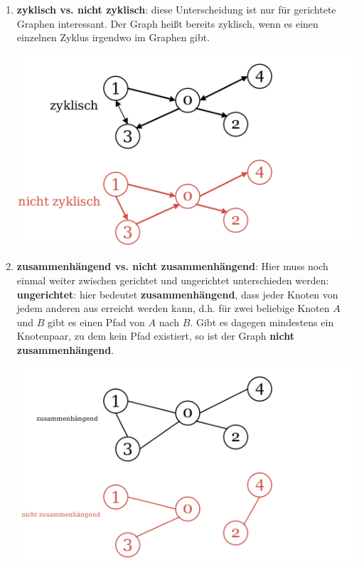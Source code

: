 \documentclass{article}
\begin{document}
\begin{enumerate}
\begin{center}
    \end{center}
    \item \textbf{zyklisch vs. nicht zyklisch}: diese Unterscheidung ist nur für gerichtete Graphen interessant. Der Graph heißt bereits zyklisch, wenn es einen einzelnen Zyklus irgendwo im Graphen gibt.\begin{center}
        \includegraphics[scale=0.15]{../media/zyklisch.png}
    \end{center}
    \item \textbf{zusammenhängend vs. nicht zusammenhängend}: Hier muss noch einmal weiter zwischen gerichtet und ungerichtet unterschieden werden: \\
    \textbf{ungerichtet}: hier bedeutet \textbf{zusammenhängend}, dass jeder Knoten von jedem anderen aus erreicht werden kann, d.h. für zwei beliebige Knoten $A$ und $B$ gibt es einen Pfad von $A$ nach $B$. Gibt es dagegen mindestens ein Knotenpaar, zu dem kein Pfad existiert, so ist der Graph \textbf{nicht zusammenhängend}. \begin{center}
        \includegraphics[scale=0.15]{../media/ungerichtet_zusammenhang.png}

\end{center}
\end{enumerate}
\end{document}

